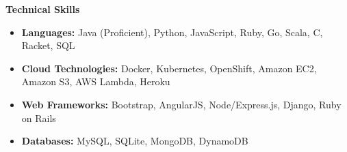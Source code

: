 \documentclass{article}
\newcommand{\resheading}[1]{{\large \colorbox{mygrey}{\begin{minipage}{\textwidth}{\textbf{#1 \vphantom{p\^{E}}}}\end{minipage}}}}
\begin{document}
    \resheading{Technical Skills}

    \begin{itemize}
        \item {
        \textbf{Languages:}
        \vspace{-0.2cm}
        Java (Proficient), Python, JavaScript, Ruby, Go, Scala, C, Racket, SQL
        }
        \item {
        \textbf{Cloud Technologies:}
        \vspace{-0.2cm}
        Docker, Kubernetes, OpenShift, Amazon EC2, Amazon S3, AWS Lambda, Heroku
        }
        \item {
        \textbf{Web Frameworks:}
        \vspace{-0.2cm}
        Bootstrap, AngularJS, Node/Express.js, Django, Ruby on Rails
        }
        \item {
        \textbf{Databases:}
        MySQL, SQLite, MongoDB, DynamoDB
        }
    \end{itemize}
\end{document}
